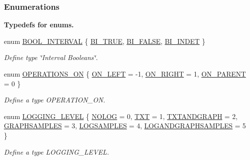 \subsubsection*{\-Enumerations}
\begin{Indent}{\bf \-Typedefs for enums.}\par
\begin{DoxyCompactItemize}
\item 
enum \hyperlink{namespacesubpavings_abf44b15764c504d6ffa87c62b45b01a6}{\-B\-O\-O\-L\-\_\-\-I\-N\-T\-E\-R\-V\-A\-L} \{ \hyperlink{namespacesubpavings_abf44b15764c504d6ffa87c62b45b01a6a6dc46ce899440df44cb246c8673f77ce}{\-B\-I\-\_\-\-T\-R\-U\-E}, 
\hyperlink{namespacesubpavings_abf44b15764c504d6ffa87c62b45b01a6af416f80a49e36092e0ce20344f72a226}{\-B\-I\-\_\-\-F\-A\-L\-S\-E}, 
\hyperlink{namespacesubpavings_abf44b15764c504d6ffa87c62b45b01a6ad05adf0e5db6a47d94c640a2cbe45eea}{\-B\-I\-\_\-\-I\-N\-D\-E\-T}
 \}
\begin{DoxyCompactList}\small\item\em \-Define type \char`\"{}\-Interval Booleans\char`\"{}. \end{DoxyCompactList}\item 
enum \hyperlink{namespacesubpavings_ae1ea349cda4812634df03761ebfc1c98}{\-O\-P\-E\-R\-A\-T\-I\-O\-N\-S\-\_\-\-O\-N} \{ \hyperlink{namespacesubpavings_ae1ea349cda4812634df03761ebfc1c98a5e4950af717b37685674f0a9fcae8abe}{\-O\-N\-\_\-\-L\-E\-F\-T} =  -\/1, 
\hyperlink{namespacesubpavings_ae1ea349cda4812634df03761ebfc1c98ad9000b1b4eb93fa2d8440f85df311107}{\-O\-N\-\_\-\-R\-I\-G\-H\-T} =  1, 
\hyperlink{namespacesubpavings_ae1ea349cda4812634df03761ebfc1c98a4863db89a4712e90bb113f9acf898781}{\-O\-N\-\_\-\-P\-A\-R\-E\-N\-T} =  0
 \}
\begin{DoxyCompactList}\small\item\em \-Define a type \-O\-P\-E\-R\-A\-T\-I\-O\-N\-\_\-\-O\-N. \end{DoxyCompactList}\item 
enum \hyperlink{namespacesubpavings_aef8e51096b59ecaf1a1e9b2ee24b6089}{\-L\-O\-G\-G\-I\-N\-G\-\_\-\-L\-E\-V\-E\-L} \{ \*
\hyperlink{namespacesubpavings_aef8e51096b59ecaf1a1e9b2ee24b6089a1e5eba048e2496b2450d63fc2e9d1737}{\-N\-O\-L\-O\-G} =  0, 
\hyperlink{namespacesubpavings_aef8e51096b59ecaf1a1e9b2ee24b6089ab2890a6eb7493029f41cf871d43877c3}{\-T\-X\-T} =  1, 
\hyperlink{namespacesubpavings_aef8e51096b59ecaf1a1e9b2ee24b6089a37f328b2c4c91409b43fc74e7f299118}{\-T\-X\-T\-A\-N\-D\-G\-R\-A\-P\-H} =  2, 
\hyperlink{namespacesubpavings_aef8e51096b59ecaf1a1e9b2ee24b6089a01fa38b021a34fb52083fdc234ab8eff}{\-G\-R\-A\-P\-H\-S\-A\-M\-P\-L\-E\-S} =  3, 
\*
\hyperlink{namespacesubpavings_aef8e51096b59ecaf1a1e9b2ee24b6089a09aa6a27c1d242b63005aa5d78b45aba}{\-L\-O\-G\-S\-A\-M\-P\-L\-E\-S} =  4, 
\hyperlink{namespacesubpavings_aef8e51096b59ecaf1a1e9b2ee24b6089afec51793a7c8838aa61a4e1b21d1245d}{\-L\-O\-G\-A\-N\-D\-G\-R\-A\-P\-H\-S\-A\-M\-P\-L\-E\-S} =  5
 \}
\begin{DoxyCompactList}\small\item\em \-Define a type \-L\-O\-G\-G\-I\-N\-G\-\_\-\-L\-E\-V\-E\-L. \end{DoxyCompactList}\end{DoxyCompactItemize}
\end{Indent}
